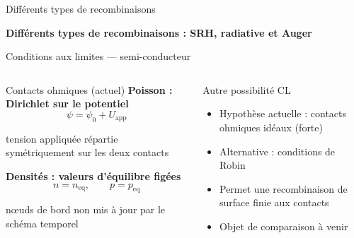 
\begin{frame}[t]{Différents types de recombinaisons}
  \vspace{-2.5em}
  \centering
      \begin{pccard}
        \centering
        \figrecombinaison
        \vspace{0.5em}
        {\scriptsize\bfseries\color{pcNavy}
        Différents types de recombinaisons : SRH, radiative et Auger}
      \end{pccard}
\end{frame}


\begin{frame}[t]{Conditions aux limites — semi-conducteur}
  \vspace{-0.5em}

  \begin{columns}[T,onlytextwidth]

      \begin{pcbanner}{Contacts ohmiques (actuel)}
        \centering\scriptsize
        \textbf{Poisson : Dirichlet sur le potentiel}
        \[ \psi = \psi_0 + U_{\mathrm{app}} \]
        {\raggedright tension appliquée répartie symétriquement sur les deux contacts\par}
        \vspace{0.4em}
        \textbf{Densités : valeurs d'équilibre figées}
        \[ n = n_{\mathrm{eq}}, \qquad p = p_{\mathrm{eq}} \]
        {\raggedright nœuds de bord non mis à jour par le schéma temporel\par}
      \end{pcbanner}

      \begin{pcbanner}{Autre possibilité CL}
        \begin{itemize}\footnotesize
          \item Hypothèse actuelle : contacts ohmiques idéaux (forte)
          \item Alternative : conditions de Robin
          \item Permet une recombinaison de surface finie aux contacts
          \item Objet de comparaison à venir
        \end{itemize}
      \end{pcbanner}

  \end{columns}

\end{frame}

